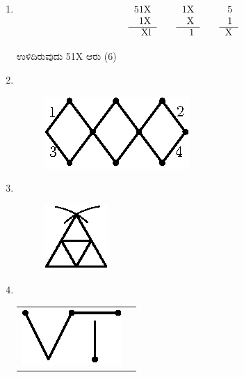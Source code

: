 \begin{enumerate}
\item 
\begin{equation*}
\begin{tabular}[t]{r}
51X \\
1X\\\cline{1-1} 
Xl
\end{tabular}
\quad\quad
\begin{tabular}[t]{r}
1X\\ 
X\\\cline{1-1} 
1
\end{tabular}
\quad\quad
\begin{tabular}[t]{r}
5\\
1\\\cline{1-1}
X
\end{tabular}
\end{equation*}

ಉಳಿದಿರುವುದು 51X ಆರು (6)

\item 
~

\begin{figure}[H]
\centering
\includegraphics[scale=1.1]{images/chap4/ans13.eps}
\end{figure}



\item 
~
\phantom{a}
\vskip -0.8cm
\begin{figure}[H]
\centering
\includegraphics[scale=1.4]{images/chap4/ans14.eps}
\end{figure}


\item
~

\begin{tabular}[t]{cc}
\includegraphics[scale =0.8]{images/chap4/ans15.eps} & \raisebox{.3cm}{$= 1$}
\end{tabular}



\end{enumerate}

